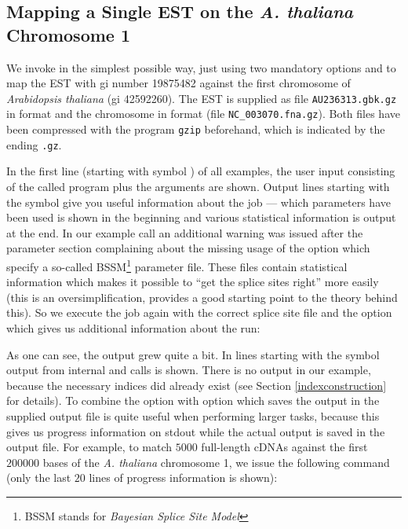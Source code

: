 \documentclass[11pt,a4paper,titlepage]{article}
\begin{document}
\subsection{Mapping a Single EST on the \textit{A. thaliana} Chromosome 1}

We invoke \Callgth in the simplest possible way, just using two mandatory
options  and  to map the EST with gi
number 19875482 against the first chromosome of \textit{Arabidopsis thaliana}
(gi 42592260). The EST is supplied as file \texttt{AU236313.gbk.gz} in \GENBANK
format and the chromosome in \Fasta format (file \texttt{NC\_003070.fna.gz}).
Both files have been compressed with the program \texttt{gzip} beforehand, which is indicated by the ending \texttt{.gz}.

\begin{scriptsize}\end{scriptsize}

In the first line (starting with symbol \texttt{}) of all examples, the
user input consisting of the called program plus the arguments are shown.
Output lines starting with the symbol \texttt{} give you useful information about the job --- which parameters have been used is shown in the beginning and various statistical information is output at the end. In our example call an additional warning was issued after the parameter section complaining about the
missing usage of the option  which specify a so-called
BSSM\footnote{BSSM stands for \emph{Bayesian Splice Site Model}} parameter file. These files contain statistical information which makes it possible to ``get the splice sites right'' more easily (this is an oversimplification, \cite{BRE:XIN:ZHU:2004} provides a good starting point to the theory behind this).
So we execute the job again with the correct splice site file and the option  which gives us additional information about the run:

\begin{scriptsize}\end{scriptsize}

As one can see, the output grew quite a bit. In lines starting with the symbol
 output from internal \callvmatch and \callmkvtree calls is shown. There
is no \callmkvtree output in our example, because the necessary indices did
already exist (see Section \ref{indexconstruction} for details).
To combine the option  with option 
which saves the output in the supplied output file is quite useful when performing larger tasks, because this gives us progress information on stdout
while the actual output is saved in the output file.
For example, to match $5000$ full-length cDNAs against the first $200000$ bases of the \textit{A. thaliana} chromosome 1, we issue the following command (only the last $20$ lines of progress information is shown):
\end{document}
